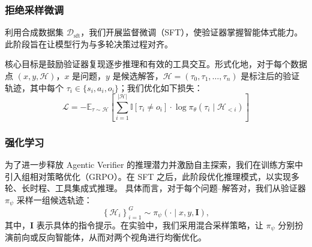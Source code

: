 \documentclass[11pt]{article}
\begin{document}
\subsubsection{拒绝采样微调}
利用合成数据集 $\mathcal{D}_{\text{sft}}$，我们开展监督微调（SFT），使验证器掌握智能体式能力。此阶段旨在让模型行为与多轮决策过程对齐。

\par
核心目标是鼓励验证器复现逐步推理和有效的工具交互。形式化地，对于每个数据点 $(x, y, \mathcal{H})$，$x$ 是问题，$y$ 是候选解答，$\mathcal{H}=(\tau_0,\tau_1,\ldots,\tau_n)$ 是标注后的验证轨迹，其中每个 $\tau_i \in \{s_i,a_i,o_i\}$；我们优化如下损失：
\begin{equation}
\mathcal{L} = - \mathbb{E}_{\tau \sim \mathcal{H}} \left[\sum_{i=1}^{|\mathcal{H}|} \mathbb{I}\left[\tau_i \neq o_i \right] \cdot \log \pi_\theta\left(\tau_i \mid \mathcal{H}_{<i}\right)\right]
\end{equation}

\subsubsection{强化学习}
为了进一步释放 Agentic Verifier 的推理潜力并激励自主探索，我们在训练方案中引入组相对策略优化（GRPO）。在 SFT 之后，此阶段优化推理模式，以实现多轮、长时程、工具集成式推理。
具体而言，对于每个问题--解答对，我们从验证器 $\pi_{\psi}$ 采样一组候选轨迹：
\begin{equation}
\left\{\mathcal{H}_i\right\}_{i=1}^G \sim \pi_{\psi}(\cdot \mid x, y, \mathbf{I}),
\end{equation}
其中，$\mathbf{I}$ 表示具体的指令提示。在实验中，我们采用混合采样策略，让 $\pi_{\psi}$ 分别扮演前向或反向智能体，从而对两个视角进行均衡优化。
\end{document}
